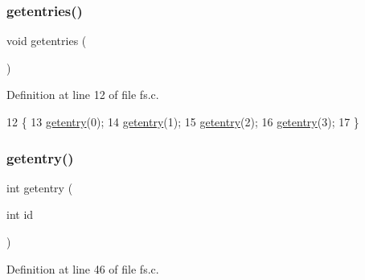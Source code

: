 \subsubsection{\texorpdfstring{getentries()}{getentries()}}
{\footnotesize\ttfamily void getentries (\begin{DoxyParamCaption}{ }\end{DoxyParamCaption})}



Definition at line 12 of file fs.\+c.


\begin{DoxyCode}
12                   \{
13     \hyperlink{a00143_a3fb32d07d3bd05144a196c94fc59c0d1_a3fb32d07d3bd05144a196c94fc59c0d1}{getentry}(0);
14     \hyperlink{a00143_a3fb32d07d3bd05144a196c94fc59c0d1_a3fb32d07d3bd05144a196c94fc59c0d1}{getentry}(1);
15     \hyperlink{a00143_a3fb32d07d3bd05144a196c94fc59c0d1_a3fb32d07d3bd05144a196c94fc59c0d1}{getentry}(2);
16     \hyperlink{a00143_a3fb32d07d3bd05144a196c94fc59c0d1_a3fb32d07d3bd05144a196c94fc59c0d1}{getentry}(3);
17 \}
\end{DoxyCode}
\mbox{\label{a00146_a3fb32d07d3bd05144a196c94fc59c0d1_a3fb32d07d3bd05144a196c94fc59c0d1}} 
\subsubsection{\texorpdfstring{getentry()}{getentry()}}
{\footnotesize\ttfamily int getentry (\begin{DoxyParamCaption}\item[{int}]{id }\end{DoxyParamCaption})}



Definition at line 46 of file fs.\+c.



